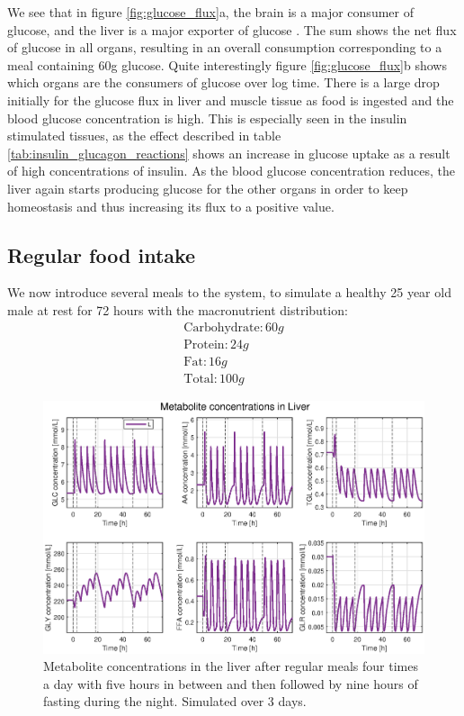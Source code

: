 \documentclass{IEEEtran}
\begin{document}
We see that in figure \ref{fig:glucose_flux}a, the brain is a major consumer of glucose, and the liver is a major exporter of glucose  \cite{miesfeld_mcevoy_2017}. The sum shows the net flux of glucose in all organs, resulting in an overall consumption corresponding to a meal containing 60g glucose. Quite interestingly figure \ref{fig:glucose_flux}b shows which organs are the consumers of glucose over log time. There is a large drop initially for the glucose flux in liver and muscle tissue as food is ingested and the blood glucose concentration is high. This is especially seen in the insulin stimulated tissues, as the effect described in table \ref{tab:insulin_glucagon_reactions} shows an increase in glucose uptake as a result of high concentrations of insulin. As the blood glucose concentration reduces, the liver again starts producing glucose for the other organs in order to keep homeostasis and thus increasing its flux to a positive value.


\subsection{Regular food intake}
We now introduce several meals to the system, to simulate a healthy 25 year old male at rest for 72 hours with the macronutrient distribution: \\
\begin{equation*}
\begin{split}
    \text{Carbohydrate}: 60 g \\
    \text{Protein}: 24 g \\
    \text{Fat}: 16 g \\ \hline
    \text{Total}: 100g
\end{split}
\end{equation*}


\begin{figure}[H]
    \includegraphics[trim=35 10 35 0, width=\columnwidth]{Diagrams/Food/liver_plot.eps}
    \caption{Metabolite concentrations in the liver after regular meals four times a day with five hours in between and then followed by nine hours of fasting during the night. Simulated over 3 days.}
    \label{fig:food_plots_bends_cars}
\end{figure}
\end{document}
